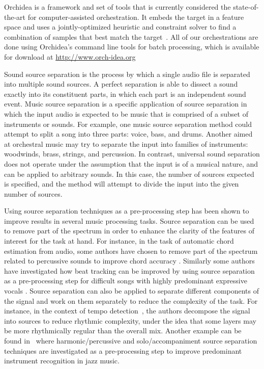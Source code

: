 \documentclass{article}
\begin{document}
  Orchidea is a framework and set of tools that is currently considered the state-of-the-art for computer-assisted orchestration. It embeds the target in a feature space and uses a jointly-optimized heuristic and constraint solver to find a combination of samples that best match the target~\cite{Cella18, Cella2020}. All of our orchestrations are done using Orchidea's command line tools for batch processing, which is available for download at \url{http://www.orch-idea.org}

  Sound source separation is the process by which a single audio file is separated into multiple sound sources. A perfect separation is able to dissect a sound exactly into its constituent parts, in which each part is an independent sound event. Music source separation is a specific application of source separation in which the input audio is expected to be music that is comprised of a subset of instruments or sounds. For example, one music source separation method could attempt to split a song into three parts: voice, bass, and drums. Another aimed at orchestral music may try to separate the input into families of instruments: woodwinds, brass, strings, and percussion. In contrast, universal sound separation does not operate under the assumption that the input is of a musical nature, and can be applied to arbitrary sounds. In this case, the number of sources expected is specified, and the method will attempt to divide the input into the given number of sources.    
  
  Using source separation techniques as a pre-processing step has been shown to improve results in several music processing tasks. Source separation can be used to remove part of the spectrum in order to enhance the clarity of the features of interest for the task at hand. For instance, in the task of automatic chord estimation from audio, some authors have chosen to remove part of the spectrum related to percussive sounds to improve chord accuracy \cite{Reed_al2009}. Similarly some authors have investigated how beat tracking can be improved by using source separation as a pre-processing step for difficult songs with highly predominant expressive vocals \cite{ZapGom2012}. Source separation can also be applied to separate different components of the signal and work on them separately to reduce the complexity of the task. For instance, in the context of tempo detection~\cite{ChoRae2009}, the authors decompose the signal into sources to reduce rhythmic complexity, under the idea that some layers may be more rhythmically regular than the overall mix. Another example can be found in~\cite{GomAbecan2018} where harmonic/percussive and solo/accompaniment source separation techniques are investigated as a pre-processing step to improve predominant instrument recognition in jazz music.
    
\end{document}
